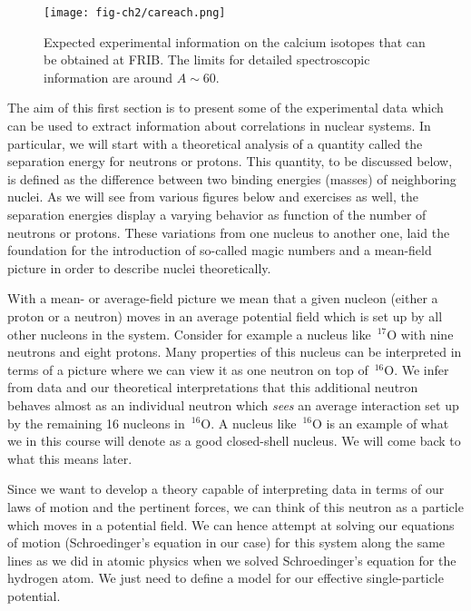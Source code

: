 \documentclass[graybox,sectrefs,envcountresetchap,open=right]{svmonodo}
\begin{document}
\begin{figure}[t]
  \centerline{\texttt{[image: fig-ch2/careach.png]}}
  \caption{
  Expected experimental information on the calcium isotopes that can be obtained at FRIB. The limits for detailed spectroscopic information are around $A\sim 60$.
  }
\end{figure}



The aim of this first section is to present some of the experimental data which can be used to extract 
information about correlations in nuclear systems. In particular, we will start with a theoretical analysis of a quantity called the separation energy for neutrons or protons. This quantity, to be discussed below, is defined as the difference between two binding energies (masses) of neighboring nuclei. As we will see from various figures below and exercises as well, the separation energies display a varying behavior as function of the number of neutrons or protons. These variations from one nucleus to another one, laid the foundation for the introduction of so-called magic numbers and a mean-field picture in order to describe nuclei theoretically.



With a mean- or average-field picture we mean that a given nucleon (either a proton or a neutron) moves in an average potential field which is set up by all other nucleons in the system. Consider for example a nucleus like $\,{}^{17}\mbox{O}$ with nine neutrons and eight protons. Many properties  of this nucleus can be interpreted in terms of a picture where we can view it as
one neutron on top of $\,{}^{16}\mbox{O}$. We infer from data and our theoretical interpretations that this additional neutron behaves almost as an individual neutron which \emph{sees} an average interaction set up by the remaining 16 nucleons in   $\,{}^{16}\mbox{O}$. A nucleus like $\,{}^{16}\mbox{O}$ is an example of what we in this course will denote as a good closed-shell nucleus. We will come back to what this means later.

Since we want to develop a theory capable of interpreting data in terms of our laws of motion and the pertinent forces,
we can think of this neutron as a particle which moves in a potential field. We can hence attempt at solving our equations of motion (Schroedinger's equation in our case) for this system along the same lines as we did in atomic physics when we solved Schroedinger's equation for the hydrogen atom. We just need to define a model for our effective single-particle potential. 
\end{document}
